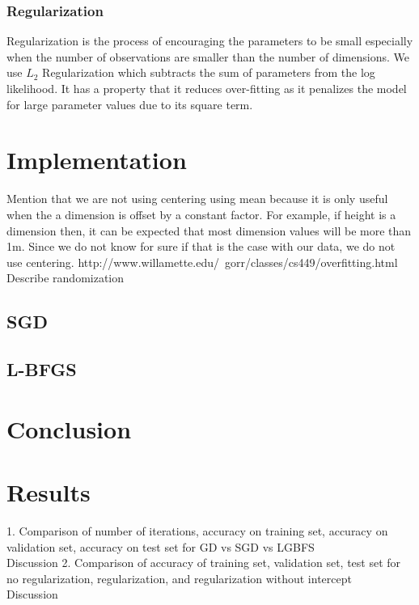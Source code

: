 \documentclass{acm_proc_article-sp}
\begin{document}
\subsubsection*{Regularization}
Regularization is the process of encouraging the parameters to be small especially when the number of observations are smaller than the number of dimensions\cite{ng2004feature}. We use $L_2$ Regularization which subtracts the sum of parameters from the log likelihood. It has a property that it reduces over-fitting as it penalizes the model for large parameter values due to its square term.
\section{Implementation}
Mention that we are not using centering using mean because it is only useful when the a dimension is offset by a constant factor\cite{bro2003centering}. For example, if height is a dimension then, it can be expected that most dimension values will be more than 1m. Since we do not know for sure if that is the case with our data, we do not use centering.
http://www.willamette.edu/~gorr/classes/cs449/overfitting.html
Describe randomization
\subsection{SGD}
\subsection{L-BFGS}
\section{Conclusion}
\section{Results}
1. Comparison of number of iterations, accuracy on training set, accuracy on validation set, accuracy on test set for GD vs SGD vs LGBFS\\
Discussion
2. Comparison of accuracy of training set, validation set, test set for no regularization, regularization, and regularization without intercept\\
Discussion
\end{document}

